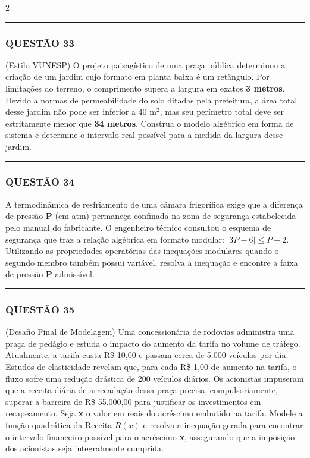 \documentclass[11pt, a4paper]{article}
\begin{document}
\begin{multicols*}{2}
\vspace{0cm} \noindent\textcolor{CorLinha}{\rule{\linewidth}{0.5pt}} \vspace{-0.2cm}
\subsubsection*{QUESTÃO 33}
(Estilo VUNESP) O projeto paisagístico de uma praça pública determinou a criação de um jardim cujo formato em planta baixa é um retângulo. Por limitações do terreno, o comprimento supera a largura em exatos \textbf{3 metros}. Devido a normas de permeabilidade do solo ditadas pela prefeitura, a área total desse jardim não pode ser inferior a $ 40 \text{ m}^2 $, mas seu perímetro total deve ser estritamente menor que \textbf{34 metros}. Construa o modelo algébrico em forma de sistema e determine o intervalo real possível para a medida da largura desse jardim.

\vspace{0cm} \noindent\textcolor{CorLinha}{\rule{\linewidth}{0.5pt}} \vspace{-0.2cm}
\subsubsection*{QUESTÃO 34}
A termodinâmica de resfriamento de uma câmara frigorífica exige que a diferença de pressão \textbf{P} (em atm) permaneça confinada na zona de segurança estabelecida pelo manual do fabricante. O engenheiro técnico consultou o esquema de segurança que traz a relação algébrica em formato modular: $ |3P - 6| \le P + 2 $. Utilizando as propriedades operatórias das inequações modulares quando o segundo membro também possui variável, resolva a inequação e encontre a faixa de pressão \textbf{P} admissível.

\vspace{0cm} \noindent\textcolor{CorLinha}{\rule{\linewidth}{0.5pt}} \vspace{-0.2cm}
\subsubsection*{QUESTÃO 35}
(Desafio Final de Modelagem) Uma concessionária de rodovias administra uma praça de pedágio e estuda o impacto do aumento da tarifa no volume de tráfego. Atualmente, a tarifa custa R\$ 10,00 e passam cerca de 5.000 veículos por dia. Estudos de elasticidade revelam que, para cada R\$ 1,00 de aumento na tarifa, o fluxo sofre uma redução drástica de 200 veículos diários. Os acionistas impuseram que a receita diária de arrecadação dessa praça precisa, compulsoriamente, superar a barreira de R\$ 55.000,00 para justificar os investimentos em recapeamento. 
Seja \textbf{x} o valor em reais do acréscimo embutido na tarifa. Modele a função quadrática da Receita $ R(x) $ e resolva a inequação gerada para encontrar o intervalo financeiro possível para o acréscimo \textbf{x}, assegurando que a imposição dos acionistas seja integralmente cumprida.

\end{multicols*}
\end{document}
